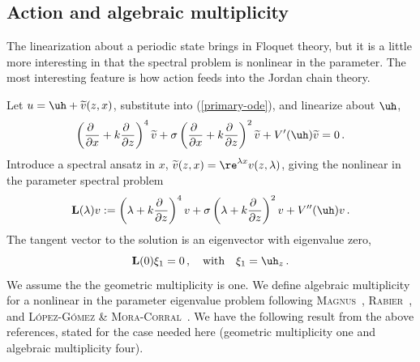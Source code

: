\documentclass[10pt]{article}
\begin{document}
\subsection{Action and algebraic multiplicity}
\label{subsec-floquet}

The linearization about a periodic state brings in Floquet theory, but it is a
little more interesting in that the spectral problem is nonlinear in the
parameter.
 The most interesting feature is how action feeds
into the Jordan chain theory.

Let $u=\uh + \widetilde v(z,x)$, substitute into (\ref{primary-ode}), and
linearize about $\uh$,
%
\begin{equation}\label{sh-eqn-zxs}
\left(\frac{\partial\ }{\partial x} + k \frac{\partial\ }{\partial z}\right)^4\widetilde v
 + \sigma \left(\frac{\partial\ }{\partial x} + k \frac{\partial\ }{\partial z}\right)^2\widetilde v +V'(\uh)\widetilde v = 0 \,.
\end{equation}
%
Introduce a spectral ansatz in $x$, $\widetilde v(z,x) = \re^{\lambda x}
v(z,\lambda)$, giving the nonlinear in the parameter spectral problem
%
\begin{equation}\label{L-lambda-def}
{\bf L}(\lambda)v := 
\left(\lambda + k \frac{\partial\ }{\partial z}\right)^4v
 + \sigma \left(\lambda + k \frac{\partial\ }{\partial z}\right)^2v +V''(\uh)v\,.
\end{equation}
%
The tangent vector to the solution is an eigenvector with eigenvalue zero,
%
\begin{equation}\label{xi1-def}
  {\bf L}(0)\xi_1 = 0\,,\quad \mbox{with}\quad \xi_1 = \uh_z\,.
\end{equation}
%
  We assume the the geometric multiplicity is one. We define algebraic
  multiplicity for a nonlinear in the parameter eigenvalue problem following
  \textsc{Magnus}~\cite{magnus}, \textsc{Rabier}~\cite{rabier}, and
  \textsc{L\'opez-G\'omez \& Mora-Corral}~\cite{LGMG-book}.  
We have the following result from the above references, stated for the case
needed here (geometric multiplicity one and algebraic multiplicity four).
\end{document}
